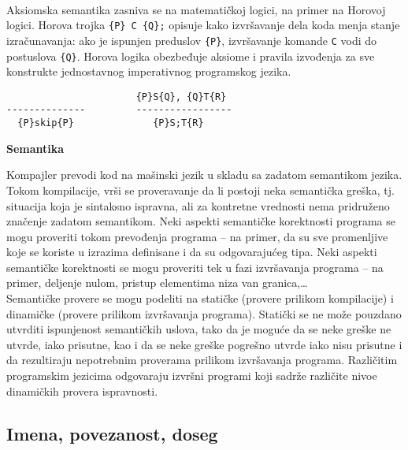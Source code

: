 \documentclass[../main.tex]{subfiles}
\begin{document}
 \\

Aksiomska semantika zasniva se na matematičkoj logici, na primer na Horovoj logici.
Horova trojka \texttt{\{P\} C \{Q\};} opisuje kako izvršavanje dela koda menja stanje izračunavanja: ako je ispunjen preduslov \texttt{\{P\}}, izvršavanje komande \texttt{C} vodi do postuslova \texttt{\{Q\}}.
Horova logika obezbeđuje aksiome i pravila izvođenja za sve konstrukte jednostavnog imperativnog programskog jezika.
\begin{boxprimer}[width=\linewidth/2]
\begin{Verbatim}
                       {P}S{Q}, {Q}T{R}
--------------         -----------------
  {P}skip{P}              {P}S;T{R}  
\end{Verbatim}
\end{boxprimer}

{\bf Semantika} \hfill 

	Kompajler prevodi kod na mašinski jezik u skladu sa zadatom semantikom jezika. Tokom kompilacije, vrši se proveravanje da li postoji neka semantička greška, tj. situacija koja je sintaksno ispravna, ali za kontretne vrednosti nema pridruženo značenje zadatom semantikom. Neki aspekti semantičke korektnosti programa se mogu proveriti tokom prevođenja programa -- na primer, da su sve promenljive koje se koriste u izrazima definisane i da su odgovarajućeg tipa. Neki aspekti semantičke korektnosti se mogu proveriti tek u fazi izvršavanja programa -- na primer, deljenje nulom, pristup elementima niza van granica,\ldots\\
	Semantičke provere se mogu podeliti na statičke (provere prilikom kompilacije) i dinamičke (provere prilikom izvršavanja programa). Statički se ne može pouzdano utvrditi ispunjenost semantičkih uslova, tako da je moguće da se neke greške ne utvrde, iako prisutne, kao i da se neke greške pogrešno utvrde iako nisu prisutne i da rezultiraju nepotrebnim proverama prilikom izvršavanja programa. Različitim programskim jezicima odgovaraju izvršni programi koji sadrže različite nivoe dinamičkih provera ispravnosti. 

\subsection{Imena, povezanost, doseg}
\end{document}

